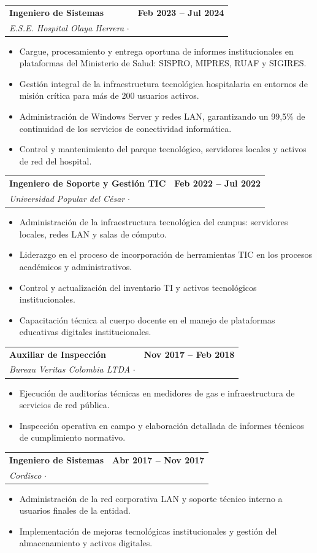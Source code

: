 \documentclass[10pt, letterpaper]{article}
\makeatletter
\newcommand{\cventry}[5]{%
  \noindent
  \begin{tabularx}{\linewidth}{@{}X r@{}}
    {\bfseries\color{primary} #1} & {\small\color{medgray}\bfseries #2} \\
    {\small\color{accent}\itshape #3} \quad $\cdot$ \quad {\small\color{darkgray} #4} & \\
  \end{tabularx}
  \vspace{-2pt}
  #5
  \vspace{4pt}
}
\makeatother
\begin{document}
\cventry
  {Ingeniero de Sistemas}
  {Feb 2023 -- Jul 2024}
  {E.S.E. Hospital Olaya Herrera}
  {Gamarra, Cesar -- Presencial}
  {
    \begin{itemize}
      \item Cargue, procesamiento y entrega oportuna de informes institucionales en plataformas del Ministerio de Salud: SISPRO, MIPRES, RUAF y SIGIRES.
      \item Gestión integral de la infraestructura tecnológica hospitalaria en entornos de misión crítica para más de 200 usuarios activos.
      \item Administración de Windows Server y redes LAN, garantizando un 99,5\% de continuidad de los servicios de conectividad informática.
      \item Control y mantenimiento del parque tecnológico, servidores locales y activos de red del hospital.
    \end{itemize}
  }

\cventry
  {Ingeniero de Soporte y Gestión TIC}
  {Feb 2022 -- Jul 2022}
  {Universidad Popular del César}
  {Aguachica, Cesar -- Presencial}
  {
    \begin{itemize}
      \item Administración de la infraestructura tecnológica del campus: servidores locales, redes LAN y salas de cómputo.
      \item Liderazgo en el proceso de incorporación de herramientas TIC en los procesos académicos y administrativos.
      \item Control y actualización del inventario TI y activos tecnológicos institucionales.
      \item Capacitación técnica al cuerpo docente en el manejo de plataformas educativas digitales institucionales.
    \end{itemize}
  }

\cventry
  {Auxiliar de Inspección}
  {Nov 2017 -- Feb 2018}
  {Bureau Veritas Colombia LTDA}
  {Bucaramanga, Santander -- Presencial}
  {
    \begin{itemize}
      \item Ejecución de auditorías técnicas en medidores de gas e infraestructura de servicios de red pública.
      \item Inspección operativa en campo y elaboración detallada de informes técnicos de cumplimiento normativo.
    \end{itemize}
  }

\cventry
  {Ingeniero de Sistemas}
  {Abr 2017 -- Nov 2017}
  {Cordisco}
  {Aguachica, Cesar -- Presencial}
  {
    \begin{itemize}
      \item Administración de la red corporativa LAN y soporte técnico interno a usuarios finales de la entidad.
      \item Implementación de mejoras tecnológicas institucionales y gestión del almacenamiento y activos digitales.
    \end{itemize}
  }
\end{document}
